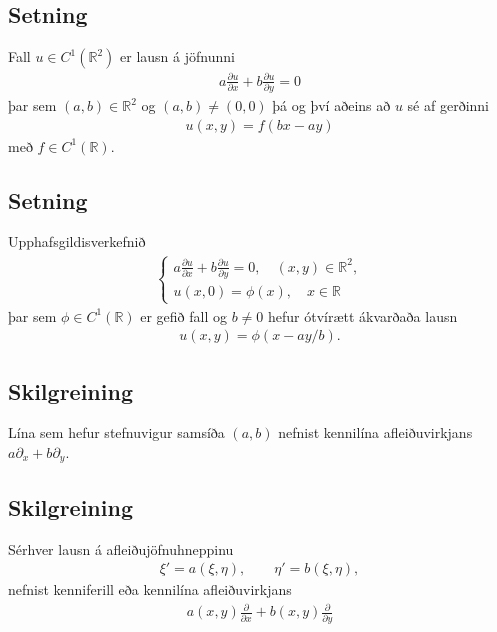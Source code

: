 \documentclass[a4paper,10pt,icelandic]{sphinxmanual}
\begin{document}
\subsection{Setning}
\label{\detokenize{Kafli01:setning}}
Fall \(u\in C^1(\mathbb{R}^2)\) er lausn á jöfnunni
\begin{equation*}
\begin{split}a\frac{\partial u}{\partial x}+ b\frac{\partial u}{\partial y} = 0\end{split}
\end{equation*}
þar sem \((a,b)\in\mathbb{R}^2\) og \((a,b)\neq (0,0)\) þá og því aðeins að \(u\) sé af gerðinni
\begin{equation*}
\begin{split}u(x,y) = f(bx-ay)\end{split}
\end{equation*}
með \(f\in C^1(\mathbb{R})\).


\subsection{Setning}
\label{\detokenize{Kafli01:id1}}
Upphafsgildisverkefnið
\begin{equation*}
\begin{split}\left\{\begin {array}{l}
a\frac{\partial u}{\partial x}+ b\frac{\partial u}{\partial y} = 0, \quad (x,y)\in \mathbb{R}^2, \\
u(x,0) = \phi(x),\quad x \in \mathbb{R}
\end{array}\right.\end{split}
\end{equation*}
þar sem \(\phi \in C^1(\mathbb{R})\) er gefið fall og \(b\neq 0\) hefur ótvírætt ákvarðaða lausn
\begin{equation*}
\begin{split}u(x,y) = \phi(x-ay/b).\end{split}
\end{equation*}

\subsection{Skilgreining}
\label{\detokenize{Kafli01:skilgreining}}
Lína sem hefur stefnuvigur samsíða \((a, b)\) nefnist kennilína afleiðuvirkjans \(a\partial_x + b\partial_y\).


\subsection{Skilgreining}
\label{\detokenize{Kafli01:id2}}
Sérhver lausn  á afleiðujöfnuhneppinu
\begin{equation*}
\begin{split}\xi' = a(\xi,\eta), \qquad \eta' = b(\xi,\eta),\end{split}
\end{equation*}
nefnist kenniferill eða kennilína afleiðuvirkjans
\begin{equation*}
\begin{split}a(x,y)\frac{\partial}{\partial x} + b(x,y) \frac{\partial}{\partial y}\end{split}
\end{equation*}
\end{document}
